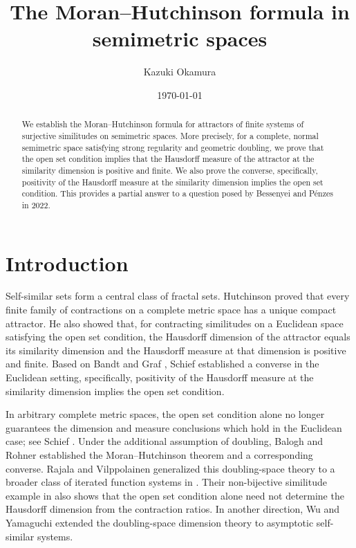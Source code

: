 \documentclass[a4paper, reqno, 11pt]{amsart}
\theoremstyle{definition}
\begin{document}
\begin{abstract}
We establish the Moran--Hutchinson formula for attractors of finite systems of surjective similitudes on semimetric spaces. 
More precisely, for a complete, normal semimetric space satisfying strong regularity and geometric doubling, 
we prove that the open set condition implies that the Hausdorff measure of the attractor at the similarity dimension is positive and finite.  
We also prove the converse, specifically, positivity of the Hausdorff measure at the similarity dimension implies the open set condition. 
This provides a partial answer to a question posed by Bessenyei and P\'enzes in 2022. 
\end{abstract}

\title{The Moran--Hutchinson formula in semimetric spaces}
\author{Kazuki Okamura}
\date{\today}
\address{Department of Mathematics, Faculty of Science, Shizuoka University, 836, Ohya, Suruga-ku, Shizuoka, 422-8529, JAPAN.}
\maketitle

\section{Introduction}

Self-similar sets form a central class of fractal sets. 
Hutchinson \cite{Hutchinson1981} proved that every finite family of contractions on a complete metric space has a unique compact attractor. 
He also showed that, for contracting similitudes on a Euclidean space satisfying the open set condition, the Hausdorff dimension of the attractor equals its similarity dimension and the Hausdorff measure at that dimension is positive and finite. 
Based on Bandt and Graf \cite{BandtGraf1992}, 
Schief \cite{Schief1994} established a converse in the Euclidean setting,  
specifically, positivity of the Hausdorff measure at the similarity dimension implies the open set condition.


In arbitrary complete metric spaces, the open set condition alone no longer guarantees the dimension and measure conclusions which hold in the Euclidean case; see Schief \cite{Schief1996}.  
Under the additional assumption of doubling, Balogh and Rohner \cite{BaloghRohner2007} established the Moran--Hutchinson theorem and a corresponding converse.  
Rajala and Vilppolainen generalized this doubling-space theory to a broader class of iterated function systems in \cite[Theorem 4.9]{RajalaVilppolainen2011}.  
Their non-bijective similitude example in \cite[Example 4.5]{RajalaVilppolainen2011} also shows that the open set condition alone need not determine the Hausdorff dimension from the contraction ratios.  
In another direction, Wu and Yamaguchi \cite{WuYamaguchi2017} extended the doubling-space dimension theory to asymptotic self-similar systems.
\end{document}
